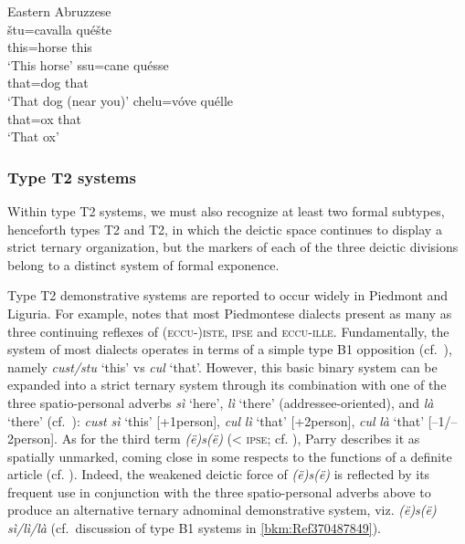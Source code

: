 \documentclass[output=paper]{langsci/langscibook}
\begin{document}
\ea Eastern Abruzzese \citep{Verratti:1968a}\\
    \ea
    \gll štu=cavalla  quéšte\\
             this=horse  this\\
    \glt \enquote*{This horse}
    \ex
    \gll ssu=cane  quésse\\
             that=dog  that\\
    \glt  \enquote*{That dog (near you)}
    \ex
    \gll  chelu=vóve  quélle\\
            that=ox  that\\
    \glt \enquote*{That ox}
    \z
\z

\subsubsection{\label{bkm:Ref370495541}Type T2 systems}

Within type T2 systems, we must also recognize at least two formal subtypes,
henceforth types T2 and T2, in which the deictic space continues
to display a strict ternary organization, but the markers of each of the three
deictic divisions belong to a distinct system of formal exponence.

Type T2 demonstrative systems are reported to occur widely in Piedmont
and Liguria. For example, \citet[241]{Parry:1997a} notes that most Piedmontese
dialects present as many as three  continuing reflexes of
\textsc{(eccu-)iste,} \textsc{ipse} and \textsc{eccu-ille}. Fundamentally, the
system of most dialects operates in terms of a simple type B1 opposition
(cf.\ ), namely \emph{cust/stu} ‘this’ vs \emph{cul}
‘that’. However, this basic binary system can be expanded into a strict ternary
system through its combination with one of the three spatio-personal adverbs
\emph{sì} ‘here’, \emph{lì} ‘there’ (addressee-oriented), and \emph{là} ‘there’
(cf.\ \citealt[219]{Lombardi-Vallauri:1995a}): \emph{cust} \emph{sì} ‘this’
[+1person], \emph{cul} \emph{lì} ‘that’ [+2person], \emph{cul} \emph{là} ‘that’
[–1/–2person]. As for the third term \emph{(ë)s(ë)} (< \textsc{ipse}; cf.
\citealt{Ascoli:1901a}), Parry describes it as spatially unmarked, coming close
in some respects to the functions of a definite article (cf.
\citealt[214]{Lombardi-Vallauri:1995a}). Indeed, the weakened deictic force of
\emph{(ë)s(ë)} is reflected by its frequent use in conjunction with the three
spatio-personal adverbs above to produce an alternative ternary adnominal
demonstrative system, viz. \emph{(ë)s(ë)} \emph{sì/lì/là} (cf.\ discussion of
type B1 systems in \cref{bkm:Ref370487849}).
\end{document}
